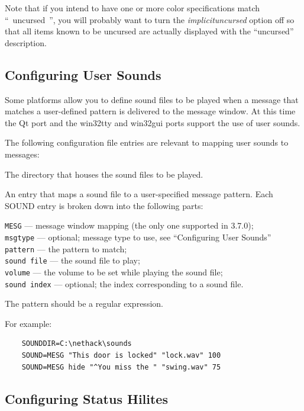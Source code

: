 \documentclass[titlepage]{article}
\begin{document}
Note that if you intend to have one or more color specifications match
``~uncursed~'', you will probably want to turn the
\textit{implicit\textunderscore uncursed}
option off so that all items known to be uncursed are actually
displayed with the ``uncursed'' description.

\subsection*{Configuring User Sounds}

Some platforms allow you to define sound files to be played when a message
that matches a user-defined pattern is delivered to the message window.
At this time the Qt port and the win32tty and win32gui ports support the
use of user sounds.

The following configuration file entries are relevant to mapping user sounds
to messages:

\begin{description}[font=\mdseries\itshape]
\item[SOUNDDIR]
The directory that houses the sound files to be played.
\item[SOUND]
An entry that maps a sound file to a user-specified message pattern.
Each SOUND entry is broken down into the following parts:

\texttt{MESG} --- message window mapping (the only one supported in 3.7.0);\\
\texttt{msgtype} --- optional; message type to use, see ``Configuring User Sounds''\\
\texttt{pattern} --- the pattern to match;\\
\texttt{sound file} --- the sound file to play;\\
\texttt{volume} --- the volume to be set while playing the sound file;\\
\texttt{sound index} --- optional; the index corresponding to a sound file.
\end{description}

The pattern should be a regular expression.

For example:

\begin{verbatim}
    SOUNDDIR=C:\nethack\sounds
    SOUND=MESG "This door is locked" "lock.wav" 100
    SOUND=MESG hide "^You miss the " "swing.wav" 75
\end{verbatim}

\subsection*{Configuring Status Hilites}
\end{document}

